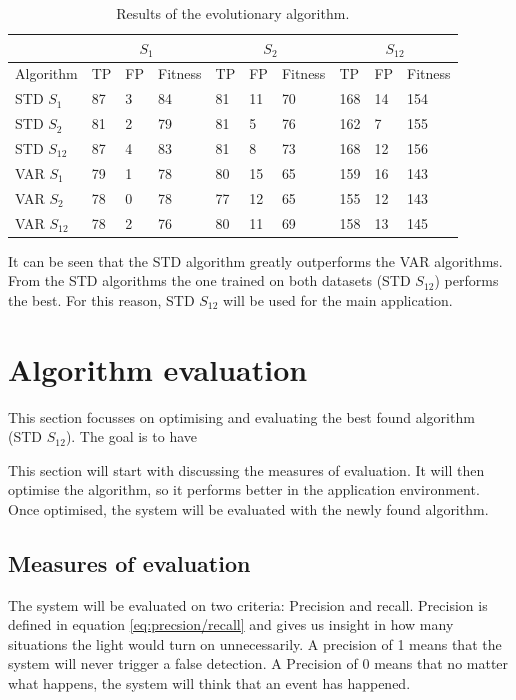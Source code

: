 \begin{table}[]
	\centering
\begin{tabular}{l|lll|lll|lll}
	& \multicolumn{3}{c|}{$S_1$} & \multicolumn{3}{c|}{$S_2$} & \multicolumn{3}{c|}{$S_{12}$} \\ \hline
	Algorithm    & TP    & FP    & Fitness    & TP    & FP    & Fitness    & TP      & FP     & Fitness    \\ \hline
	STD $S_1$    & 87    & 3     & 84         & 81    & 11    & 70         & 168     & 14     & 154        \\ \hline
	STD $S_2$    & 81    & 2     & 79         & 81    & 5     & 76         & 162     & 7      & 155        \\ \hline
	STD $S_{12}$ & 87    & 4     & 83         & 81    & 8     & 73         & 168     & 12     & 156        \\ \hline
	VAR $S_1$    & 79    & 1     & 78         & 80    & 15    & 65         & 159     & 16     & 143        \\ \hline
	VAR $S_2$    & 78    & 0     & 78         & 77    & 12    & 65         & 155     & 12     & 143        \\ \hline
	VAR $S_12$   & 78    & 2     & 76         & 80    & 11    & 69         & 158     & 13     & 145       
\end{tabular}
	\caption{Results of the evolutionary algorithm.\label{tbl:evo}}
\end{table}

It can be seen that the STD algorithm greatly outperforms the VAR algorithms. From the STD algorithms the one trained on both datasets (STD $S_{12}$) performs the best. For this reason, STD $S_{12}$ will be used for the main application.

\section{Algorithm evaluation}
This section focusses on optimising and evaluating the best found algorithm (STD $S_{12}$). The goal is to have 

This section will start with discussing the measures of evaluation. It will then optimise the algorithm, so it performs better in the application environment. Once optimised, the system will be evaluated with the newly found algorithm.

\subsection{Measures of evaluation}
The system will be evaluated on two criteria: Precision and recall. Precision is defined in equation \ref{eq:precsion/recall} and gives us insight in how many situations the light would turn on unnecessarily. A precision of 1 means that the system will never trigger a false detection. A Precision of 0 means that no matter what happens, the system will think that an event has happened.

